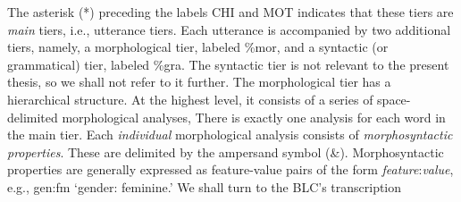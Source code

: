 The asterisk (*) preceding the labels CHI and \textsf{MOT} 
indicates that these tiers are \emph{main} tiers, i.e.,  
utterance tiers. Each utterance is accompanied by two additional tiers, 
namely, a morphological tier, labeled \textsf{\%mor}, and a syntactic 
(or grammatical) tier, labeled \textsf{\%gra}. 
The syntactic tier is not relevant to the present thesis,
so we shall not refer to it further. The morphological tier 
has a hierarchical structure. At the highest level, it consists of a 
series of space-delimited morphological analyses, 
There is exactly one analysis for each word in the main tier.  
Each \emph{individual} morphological analysis consists
of \textit{morphosyntactic properties}. These are delimited by the 
ampersand symbol (\textsf{\&}). Morphosyntactic properties are 
generally expressed as feature-value pairs of the 
form \textsf{\textit{feature}:\textit{value}}, e.g., 
\textsf{gen:fm} `gender: feminine.' We shall turn to the BLC's transcription


